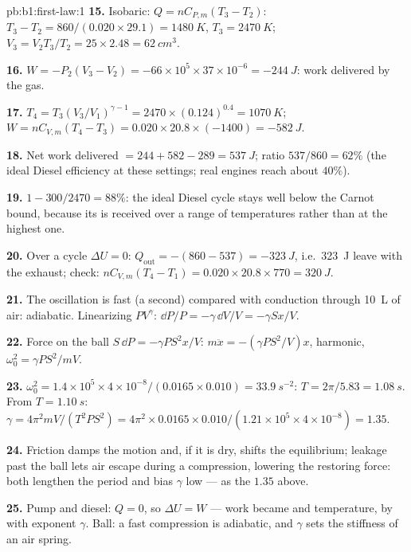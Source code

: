 \begin{solution}{pb:b1:first-law:1}
\textbf{15.} Isobaric: $Q = nC_{P,m}(T_3 - T_2)$: $T_3 - T_2 = 860/(0.020 \times
29.1) = \qty{1480}{K}$, $T_3 = \qty{2470}{K}$; $V_3 = V_2T_3/T_2 = 25 \times
2.48 = \qty{62}{cm^3}$.

\textbf{16.} $W = -P_2(V_3 - V_2) = -66\times10^5 \times 37\times10^{-6} =
\qty{-244}{J}$: work delivered by the gas.

\textbf{17.} $T_4 = T_3(V_3/V_1)^{\gamma - 1} = 2470 \times (0.124)^{0.4} =
\qty{1070}{K}$; $W = nC_{V,m}(T_4 - T_3) = 0.020 \times 20.8 \times (-1400) =
\qty{-582}{J}$.

\textbf{18.} Net work delivered $= 244 + 582 - 289 = \qty{537}{J}$; ratio
$537/860 = 62\%$ (the ideal Diesel efficiency at these settings; real
engines reach about $40\%$).

\textbf{19.} $1 - 300/2470 = 88\%$: the ideal Diesel cycle stays well
below the Carnot bound, because its  is received over a range of
temperatures rather than at the highest one.

\textbf{20.} Over a cycle $\Delta U = 0$: $Q_{\text{out}} = -(860 - 537) =
\qty{-323}{J}$, i.e.\ \qty{323}{J} leave with the exhaust; check:
$nC_{V,m}(T_4 - T_1) = 0.020 \times 20.8 \times 770 = \qty{320}{J}$.

\textbf{21.} The oscillation is fast (a second) compared with 
conduction through \qty{10}{L} of air: adiabatic. Linearizing
$PV^\gamma$: $\dd P/P = -\gamma\,\dd V/V = -\gamma Sx/V$.

\textbf{22.} Force on the ball $S\,\dd P = -\gamma PS^2x/V$: $m\ddot x =
-(\gamma PS^2/V)x$, harmonic, $\omega_0^2 = \gamma PS^2/mV$.

\textbf{23.} $\omega_0^2 = 1.4 \times 10^5 \times 4\times10^{-8}/(0.0165 \times 0.010)
= \qty{33.9}{s^{-2}}$: $T = 2\pi/5.83 = \qty{1.08}{s}$. From $T = \qty{1.10}{s}$:
$\gamma = 4\pi^2mV/(T^2PS^2) = 4\pi^2 \times 0.0165 \times 0.010/(1.21 \times 10^5
\times 4\times10^{-8}) = 1.35$.

\textbf{24.} Friction damps the motion and, if it is dry, shifts the
equilibrium; leakage past the ball lets air escape during a compression,
lowering the restoring force: both lengthen the period and bias
$\gamma$ low --- as the $1.35$ above.

\textbf{25.} Pump and diesel: $Q = 0$, so $\Delta U = W$ --- work became
 and temperature, by  with exponent
$\gamma$. Ball: a fast compression is adiabatic, and $\gamma$ sets the
stiffness of an air spring.
\end{solution}
